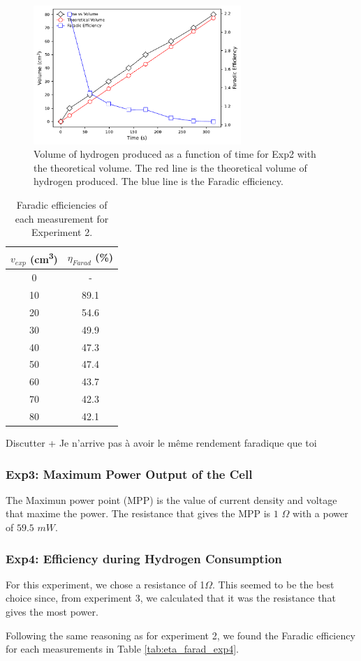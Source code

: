 \begin{figure}[H]
    \centering
    \includegraphics[width=0.7\textwidth]{Output/Exp2_vs_theo.pdf}
    \caption{Volume of hydrogen produced as a function of time for Exp2 with the theoretical volume. The red line is the theoretical volume of hydrogen produced. The blue line is the Faradic efficiency. }
    \label{fig:summary_results:exp2}
\end{figure}

\begin{table}[H]
    \centering
    \caption{Faradic efficiencies of each measurement for Experiment 2.}
    \begin{tabular}{|c|c|}
        \hline
        $v_{exp}$ (\si{\centi\meter\cubed}) & $\eta_{Farad}$ (\%) \\
        \hline
        0 & - \\
        10 & 89.1 \\
        20 & 54.6 \\
        30 & 49.9 \\
        40 & 47.3 \\
        50 & 47.4 \\
        60 & 43.7 \\
        70 & 42.3 \\
        80 & 42.1 \\
        \hline
    \end{tabular}
    \label{tab:eta_farad_exp2}
\end{table}
{\color{red} Discutter + Je n'arrive pas à avoir le même rendement faradique que toi}

\subsubsection{Exp3: Maximum Power Output of the Cell}
The Maximun power point (MPP) is the value of current density and voltage that maxime the power. The resistance that gives the MPP is $1$ $\Omega$ with a power of $59.5$ $\si{mW}$. 

\subsubsection{Exp4: Efficiency during Hydrogen Consumption}

For this experiment, we chose a resistance of 1$\Omega$. This seemed to be the best choice since, from experiment 3, we calculated that it was the resistance that gives the most power.

Following the same reasoning as for experiment 2, we found the Faradic efficiency for each measurements in Table \ref{tab:eta_farad_exp4}.
